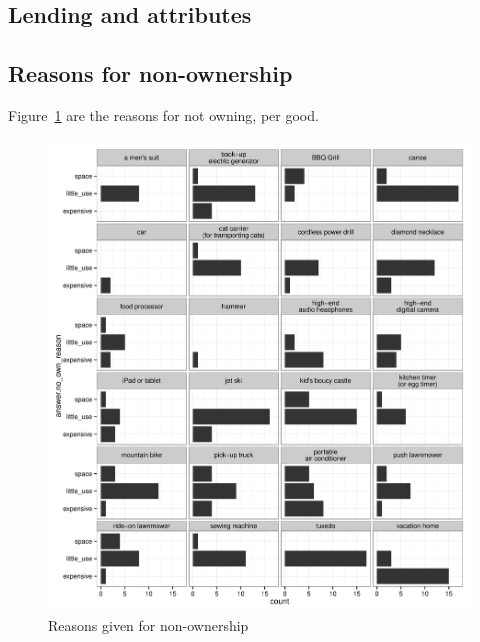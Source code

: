 \documentclass[11pt]{article}
\begin{document}
\subsection{Lending and attributes}

\subsection{Reasons for non-ownership} 

Figure~\ref{fig:reasons} are the reasons for not owning, per good. 

\begin{figure}
\centering 
\caption{Reasons given for non-ownership} 
\label{fig:reasons}
\begin{minipage}{0.90 \linewidth}
\includegraphics[width = \linewidth]{./plots/reasons.pdf} 
\end{minipage} 
\end{figure} 
\end{document}
